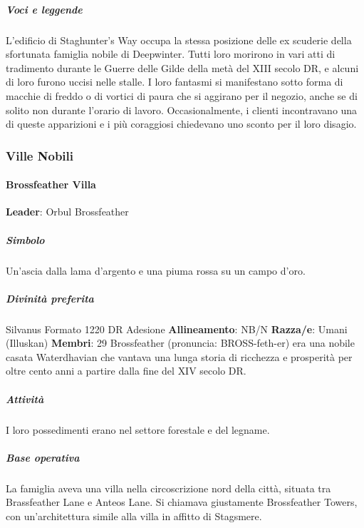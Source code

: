\documentclass{article}
\begin{document}
                                        \subparagraph{Voci e leggende}
                  L'edificio di Staghunter's Way occupa la stessa posizione delle ex scuderie della sfortunata famiglia nobile di Deepwinter. Tutti loro morirono in vari atti di tradimento durante le Guerre delle Gilde della metà del XIII secolo DR, e alcuni di loro furono uccisi nelle stalle. I loro fantasmi si manifestano sotto forma di macchie di freddo o di vortici di paura che si aggirano per il negozio, anche se di solito non durante l'orario di lavoro. Occasionalmente, i clienti incontravano una di queste apparizioni e i più coraggiosi chiedevano uno sconto per il loro disagio.

              \subsubsection{Ville Nobili}
              \paragraph{Brossfeather Villa}
                    \textbf{Leader}:
                    Orbul Brossfeather\newline
                                          \subparagraph{Simbolo}
                    Un'ascia dalla lama d'argento e una piuma rossa su un campo d'oro.
                                          \subparagraph{Divinità preferita}
                    Silvanus
                    Formato
                    1220 DR
                    Adesione
                    \textbf{Allineamento}: NB/N\newline
                    \textbf{Razza/e}: Umani (Illuskan)\newline
                    \textbf{Membri}: 29\newline
                    Brossfeather (pronuncia:  BROSS-feth-er) era una nobile casata Waterdhavian che vantava una lunga storia di ricchezza e prosperità per oltre cento anni a partire dalla fine del XIV secolo DR.

                                          \subparagraph{Attività}
                    I loro possedimenti erano nel settore forestale e del legname.

                                          \subparagraph{Base operativa}
                    La famiglia aveva una villa nella circoscrizione nord della città, situata tra Brassfeather Lane e Anteos Lane. Si chiamava giustamente Brossfeather Towers, con un'architettura simile alla villa in affitto di Stagsmere.
\end{document}
